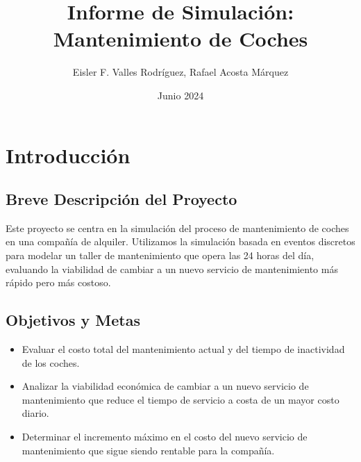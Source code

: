 \documentclass[a4paper,12pt]{article}
\title{Informe de Simulación: Mantenimiento de Coches}
\author{Eisler F. Valles Rodríguez, Rafael Acosta Márquez}
\date{Junio 2024}
\begin{document}
    \maketitle

    \tableofcontents

    \newpage


    \section{Introducción}\label{sec:introduccion}

    \subsection{Breve Descripción del Proyecto}\label{subsec:breve-descripcion-del-proyecto}
    Este proyecto se centra en la simulación del proceso de mantenimiento de coches en una compañía de alquiler.
    Utilizamos la simulación basada en eventos discretos para modelar un taller de mantenimiento que opera las 24 horas del día, evaluando la viabilidad de cambiar a un nuevo servicio de mantenimiento más rápido pero más costoso.

    \subsection{Objetivos y Metas}\label{subsec:objetivos-y-metas}
    \begin{itemize}
        \item Evaluar el costo total del mantenimiento actual y del tiempo de inactividad de los coches.
        \item Analizar la viabilidad económica de cambiar a un nuevo servicio de mantenimiento que reduce el tiempo de servicio a costa de un mayor costo diario.
        \item Determinar el incremento máximo en el costo del nuevo servicio de mantenimiento que sigue siendo rentable para la compañía.
    \end{itemize}
\end{document}
